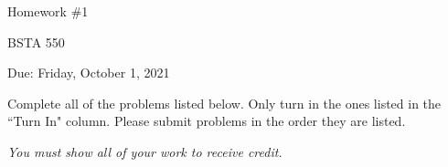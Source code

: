 \documentclass[12pt]{article}
\begin{document}
\begin{center}

Homework \#1

BSTA 550

Due: Friday, October 1, 2021

%
\bigskip



\end{center}


\bigskip

Complete all of the problems listed below. \newline 
Only turn in the ones listed in the ``Turn In" column. \newline
Please submit problems in the order they are listed.

\bigskip

\textit{You must show all of your work to receive credit.}  \newline 



\end{document}
